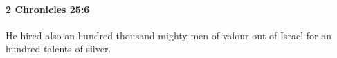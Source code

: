 
		\paragraph{2 Chronicles 25:6} %
			\label{2CHRONICLES-25-6}

			He hired also an hundred thousand mighty men of valour out of Israel for an hundred talents of silver.


